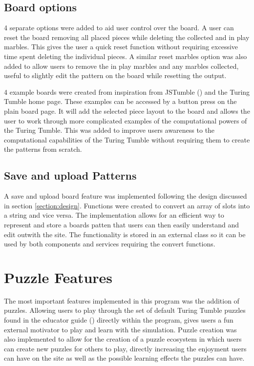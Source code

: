 \documentclass{l4proj}
\begin{document}
\subsection{Board options}
4 separate options were added to aid user control over the board. A user can reset the board removing all placed pieces while deleting the collected and in play marbles. This gives the user a quick reset function without requiring excessive time spent deleting the individual pieces. A similar reset marbles option was also added to allow users to remove the in play marbles and any marbles collected, useful to slightly edit the pattern on the board while resetting the output.

4 example boards were created from inspiration from JSTumble (\cite{jstumble}) and the Turing Tumble home page. These examples can be accessed by a button press on the plain board page. It will add the selected piece layout to the board and allows the user to work through more complicated examples of the computational powers of the Turing Tumble. This was added to improve users awareness to the computational capabilities of the Turing Tumble without requiring them to create the patterns from scratch. 

\subsection{Save and upload Patterns}
A save and upload board feature was implemented following the design discussed in section \ref{section:design}. Functions were created to convert an array of slots into a string and vice versa. The implementation allows for an efficient way to represent and store a boards patten that users can then easily understand and edit outwith the site. The functionality is stored in an external class so it can be used by both components and services requiring the convert functions.

\section{Puzzle Features}
The most important features implemented in this program was the addition of puzzles. Allowing users to play through the set of default Turing Tumble puzzles found in the educator guide (\cite{educator_resources}) directly within the program, gives users a fun external motivator to play and learn with the simulation. Puzzle creation was also implemented to allow for the creation of a puzzle ecosystem in which users can create new puzzles for others to play, directly increasing the enjoyment users can have on the site as well as the possible learning effects the puzzles can have.
\end{document}
